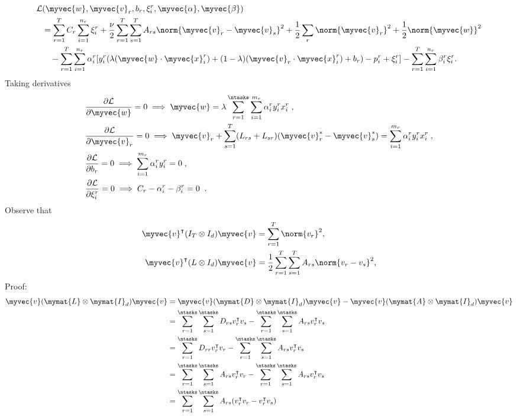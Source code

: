 \begin{equation}\label{eq:lagr_cvx-graphLap}
\begin{aligned}
        \mathcal{L}&(\myvec{w}, \myvec{v}_r, b_r, \xi_i^r, \myvec{\alpha}, \myvec{\beta}) \\
        &= \sum_{r=1}^T C_r \sum_{i=1}^{n_r}{\xi_{i}^r} + \frac{\nu}{2} \sum_{r=1}^T \sum_{s=1}^T A_{rs} \norm{\myvec{v}_r - \myvec{v}_s}^2 + \frac{1}{2} \sum_r \norm{\myvec{v}_r}^2  + \frac{1}{2} \norm{\myvec{w}}^2
        \\ &\quad  - \sum_{r=1}^T \sum_{i=1}^{n_r}{ \alpha_i^r [y_{i}^r (\lambda (\myvec{w} \cdot \myvec{x}_i^r) + (1 - \lambda) (\myvec{v}_r \cdot \myvec{x}_i^r) + b_r) - p_{i}^r + \xi_{i}^r]   } - \sum_{r=1}^T \sum_{i=1}^{n_r}{ \beta_i^r \xi_i^r }.
\end{aligned}
\end{equation}
Taking derivatives
\begin{align*}
    & \frac{\partial \mathcal{L}}{\partial \myvec{w}} = 0 \implies \myvec{w} = \lambda \sum_{r=1}^\ntasks \sum_{i=1}^{m_r}{\alpha_i^r y_i^r x_i^r}  \; , \\
    & \frac{\partial \mathcal{L}}{\partial \myvec{v}_r} = 0 \implies \myvec{v}_r + \sum_{s=1}^T (L_{rs} + L_{sr}) (\myvec{v}_r^* - \myvec{v}_s^*)= \sum_{i=1}^{m_r}{\alpha_i^r y_i^r x_i^r}  \; , \\
    & \frac{\partial \mathcal{L}}{\partial b_r} = 0 \implies  \sum_{i=1}^{m_r}{\alpha_i^r y_i^r } = 0  \; ,\\
    & \frac{\partial \mathcal{L}}{\partial \xi_i^r} = 0 \implies C_r - \alpha_i^r - \beta_i^r = 0 \; \; .
\end{align*}
Observe that
\begin{align*}
    \myvec{v}^\intercal (I_T \otimes I_d) \myvec{v} &= \sum_{r=1}^T \norm{v_r}^2 , \\
    \myvec{v}^\intercal (L \otimes I_d) \myvec{v} &= \frac{1}{2} \sum_{r=1}^T \sum_{s=1}^T A_{rs} \norm{v_r - v_s}^2 , 
\end{align*}
Proof:
\begin{align*}
    \myvec{v} (\mymat{L} \otimes \mymat{I}_d) \myvec{v} &= \myvec{v} (\mymat{D} \otimes \mymat{I}_d) \myvec{v} - \myvec{v} (\mymat{A} \otimes \mymat{I}_d) \myvec{v} \\
    &= \sum_{r=1}^\ntasks \sum_{s=1}^\ntasks D_{rs} v_r^\intercal v_s - \sum_{r=1}^\ntasks \sum_{s=1}^\ntasks A_{rs} v_r^\intercal v_s \\
    &= \sum_{r=1}^\ntasks D_{rr} v_r^\intercal v_r - \sum_{r=1}^\ntasks \sum_{s=1}^\ntasks A_{rs} v_r^\intercal v_s \\
    &= \sum_{r=1}^\ntasks \sum_{s=1}^\ntasks A_{rs} v_r^\intercal v_r - \sum_{r=1}^\ntasks \sum_{s=1}^\ntasks A_{rs} v_r^\intercal v_s \\
    &= \sum_{r=1}^\ntasks \sum_{s=1}^\ntasks A_{rs} (v_r^\intercal v_r - v_r^\intercal v_s)  \\
\end{align*}
